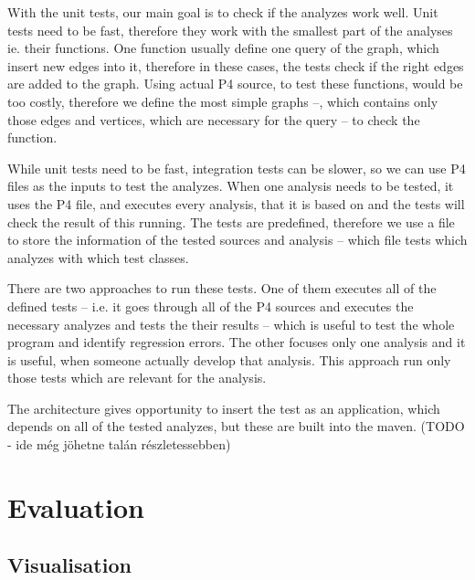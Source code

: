 \documentclass[sigconf]{acmart}
\begin{document}
	With the unit tests, our main goal is to check if the analyzes work well. Unit tests need to be fast, therefore they work with the smallest part of the analyses ie. their functions. One function usually define one query of the graph, which insert new edges into it, therefore in these cases, the tests check if the right edges are added to the graph. Using actual P4 source, to test these functions, would be too costly, therefore we define the most simple graphs --, which contains only those edges and vertices, which are necessary for the query -- to check the function.
	
	While unit tests need to be fast, integration tests can be slower, so we can use P4 files as the inputs to test the analyzes. When one analysis needs to be tested, it uses the P4 file, and executes every analysis, that it is based on and the tests will check the result of this running. The tests are predefined, therefore we use a file to store the information of the tested sources and analysis -- which file tests which analyzes with which test classes.
	
	There are two approaches to run these tests. One of them executes all of the defined tests -- i.e. it goes through all of the P4 sources and executes the necessary analyzes and tests the their results -- which is useful to test the whole program and identify regression errors. The other focuses only one analysis and it is useful, when someone actually develop that analysis. This approach run only those tests which are relevant for the analysis.
	
	The architecture gives opportunity to insert the test as an application, which depends on all of the tested analyzes, but these are built into the maven. (TODO - ide még jöhetne talán részletessebben)
	
	
	
  \section{Evaluation} %
	
	
	\subsection{Visualisation} %
  
\end{document}
